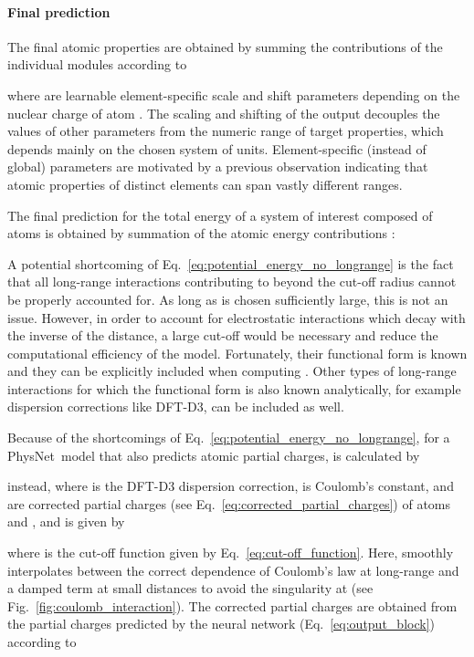 \documentclass[12pt]{article}
\newcommand{\nn}{PhysNet}
\begin{document}
\paragraph{Final prediction}
The final atomic properties  are obtained by summing the
contributions of the individual modules according to

where 
are learnable element-specific scale and shift parameters depending on
the nuclear charge  of atom . The scaling and shifting of the
output decouples the values of other parameters from the numeric range
of target properties, which depends mainly on the chosen system of
units. Element-specific (instead of global) parameters are motivated
by a previous observation indicating that atomic properties of
distinct elements can span vastly different
ranges.\cite{unke2018reactive}

The final prediction for the total energy of a system of interest
composed of  atoms is obtained by summation of the atomic energy
contributions :

A potential shortcoming of Eq.~\ref{eq:potential_energy_no_longrange}
is the fact that all long-range interactions contributing to 
beyond the cut-off radius  cannot be properly accounted
for. As long as  is chosen sufficiently large, this is
not an issue. However, in order to account for electrostatic
interactions which decay with the inverse of the distance, a large
cut-off would be necessary and reduce the computational efficiency of
the model. Fortunately, their functional form is known and they can be
explicitly included when computing . Other types of long-range
interactions for which the functional form is also known analytically,
for example dispersion corrections like
DFT-D3,\cite{grimme2010consistent} can be included as well.

Because of the shortcomings of
Eq.~\ref{eq:potential_energy_no_longrange}, for a \nn\ model that also
predicts atomic partial charges,  is calculated by

instead, where  is the DFT-D3 dispersion
correction,\cite{grimme2010consistent}  is Coulomb's constant,
 and  are corrected partial charges (see
Eq.~\ref{eq:corrected_partial_charges}) of atoms  and , and
 is given by

where  is the cut-off function given by
Eq.~\ref{eq:cut-off_function}. Here,  smoothly
interpolates between the correct  dependence of Coulomb's
law at long-range and a damped term at small distances to avoid the
singularity at  (see
Fig.~\ref{fig:coulomb_interaction}). The corrected partial charges
 are obtained from the partial charges  predicted by
the neural network (Eq.~\ref{eq:output_block}) according to
\end{document}
